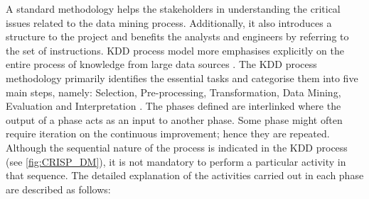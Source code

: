 A standard methodology helps the stakeholders in understanding the critical issues related to the data mining process. Additionally, it also introduces a structure to the project and benefits the analysts and engineers by referring to the set of instructions. KDD process model more emphasises explicitly on the entire process of knowledge from large data sources \autocite[39]{fayyad1996data}. The KDD process methodology primarily identifies the essential tasks and categorise them into five main steps, namely: Selection, Pre-processing, Transformation, Data Mining, Evaluation and Interpretation \autocite[42]{fayyad1996data}. The phases defined are interlinked where the output of a phase acts as an input to another phase. Some phase might often require iteration on the continuous improvement; hence they are repeated. Although the sequential nature of the process is indicated in the KDD process (see \ref{fig:CRISP_DM}), it is not mandatory to perform a particular activity in that sequence. The detailed explanation of the activities carried out in each phase are described as follows:


